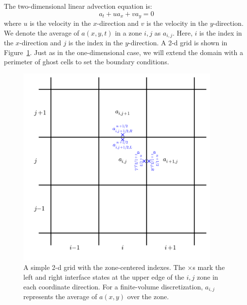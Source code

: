 The two-dimensional linear advection equation is:
\begin{equation}
a_t + u a_x + v a_y = 0
\label{eq:advect2d}
\end{equation}
where $u$ is the velocity in the $x$-direction and $v$ is the velocity in
the $y$-direction.  We denote the average of $a(x,y,t)$ in a zone $i,j$ as
$a_{i,j}$.  Here, $i$ is the index in the $x$-direction and $j$ is the
index in the $y$-direction.  A 2-d grid is shown in Figure~\ref{fig:2dgrid}.
Just as in the one-dimensional case, we will extend the domain with a
perimeter of ghost cells to set the boundary conditions.

\begin{figure}[h]
\centering
\includegraphics[width=4.0in]{2dgrid}
\caption[A 2-d grid with zone-centered indexes]{\label{fig:2dgrid} A
  simple 2-d grid with the zone-centered indexes.  The $\times$s mark
  the left and right interface states at the upper edge of the $i,j$ zone in each
  coordinate direction.  For a finite-volume discretization, $a_{i,j}$ 
  represents the average of $a(x,y)$ over the zone.}
\end{figure}

